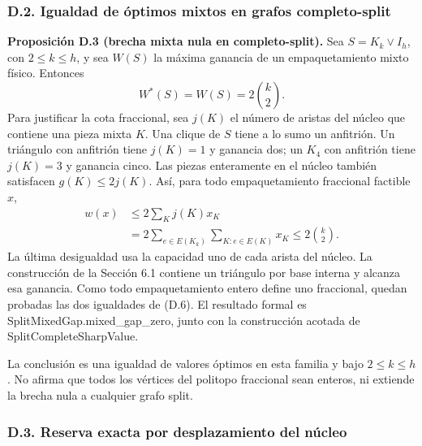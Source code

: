 \documentclass[spanish,11pt,a4paper]{article}
\begin{document}

\subsubsection{D.2. Igualdad de óptimos mixtos en grafos completo-split}\label{d.2.-igualdad-de-optimos-mixtos-en-grafos-completo-split}

\textbf{Proposición D.3 (brecha mixta nula en completo-split).} Sea \(S=K_k\vee I_h\), con \(2\le k\le h\), y sea \(W(S)\) la máxima ganancia de un empaquetamiento mixto físico. Entonces \[
W^*(S)=W(S)=2\binom k2.
\tag{D.6}
\] Para justificar la cota fraccional, sea \(j(K)\) el número de aristas del núcleo que contiene una pieza mixta \(K\). Una clique de \(S\) tiene a lo sumo un anfitrión. Un triángulo con anfitrión tiene \(j(K)=1\) y ganancia dos; un \(K_4\) con anfitrión tiene \(j(K)=3\) y ganancia cinco. Las piezas enteramente en el núcleo también satisfacen \(g(K)\le2j(K)\). Así, para todo empaquetamiento fraccional factible \(x\), \[
\begin{aligned}
w(x)&\le2\sum_K j(K)x_K\\
&=2\sum_{e\in E(K_k)}\sum_{K:e\in E(K)}x_K
\le2\binom k2.
\end{aligned}
\tag{D.7}
\] La última desigualdad usa la capacidad uno de cada arista del núcleo. La construcción de la Sección 6.1 contiene un triángulo por base interna y alcanza esa ganancia. Como todo empaquetamiento entero define uno fraccional, quedan probadas las dos igualdades de (D.6). El resultado formal es {\ttfamily\small SplitMixedGa\discretionary{\hbox{\ensuremath{\hookrightarrow}}}{}{}p.\discretionary{\hbox{\ensuremath{\hookrightarrow}}}{}{}mixed\_\discretionary{\hbox{\ensuremath{\hookrightarrow}}}{}{}gap\_\discretionary{\hbox{\ensuremath{\hookrightarrow}}}{}{}zero}, junto con la construcción acotada de {\ttfamily\small SplitComplet\discretionary{\hbox{\ensuremath{\hookrightarrow}}}{}{}eSharpValue}.

La conclusión es una igualdad de valores óptimos en esta familia y bajo \(2\le k\le h\). No afirma que todos los vértices del politopo fraccional sean enteros, ni extiende la brecha nula a cualquier grafo split.

\subsubsection{D.3. Reserva exacta por desplazamiento del núcleo}\label{d.3.-reserva-exacta-por-desplazamiento-del-nucleo}
\end{document}
